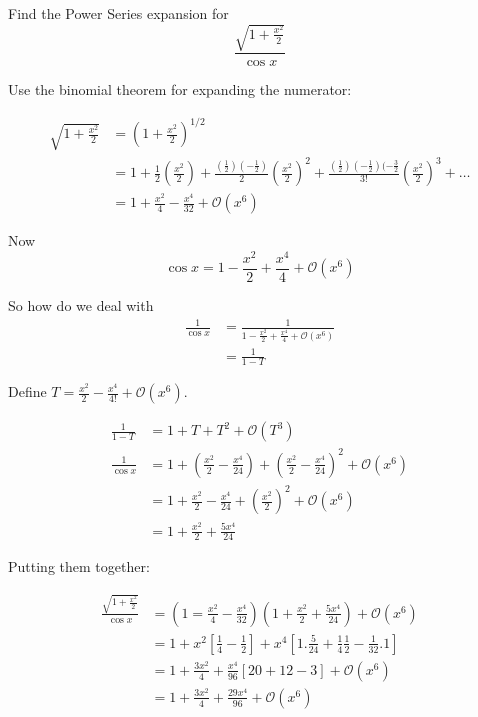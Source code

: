 \documentclass[twoside]{scrartcl}
\begin{document}
\begin{example}
Find the Power Series expansion for
\[\frac{\sqrt{1 + \frac{x^2}{2}}}{\cos x}\]	

Use the binomial theorem for expanding the numerator: 

\[
\begin{aligned}
  \sqrt{1 + \frac{x^2}{2}} &= \left(1 + \frac{x^2}{2}\right)^{1/2}\\
  &= 1 + \frac{1}{2}\left(\frac{x^2}{2}\right) + \frac{(\frac{1}{2})(-\frac{1}{2})}{2} \left(\frac{x^2}{2}\right)^2 +\frac{(\frac{1}{2})(-\frac{1}{2})(-\frac{3}{2}}{3!} \left(\frac{x^2}{2}\right)^3 + \dots \\
  &= 1 + \frac{x^2}{4} -\frac{x^4}{32} + \mathcal{O}(x^6)
\end{aligned}
\]

Now 
\[\cos x = 1 - \frac{x^2}{2} + \frac{x^4}{4} + \mathcal{O}(x^6)\]

So how do we deal with 
\[\begin{aligned}\frac{1}{\cos x} &= \frac{1}{1 - \frac{x^2}{2} + \frac{x^4}{4} + \mathcal{O}(x^6)}\\
&= \frac{1}{1-T}\end{aligned}\]

Define $T = \frac{x^2}{2} -\frac{x^4}{4!} + \mathcal{O}(x^6)$. 

\[
\begin{aligned}
  \frac{1}{1-T} &= 1 + T + T^2 + \mathcal{O}(T^3)\\
  \frac{1}{\cos x} &= 1 + \left(\frac{x^2}{2} - \frac{x^4}{24}\right) + \left(\frac{x^2}{2} - \frac{x^4}{24}\right)^2 + \mathcal{O}(x^6)\\
  &= 1 + \frac{x^2}{2} - \frac{x^4}{24} + \left(\frac{x^2}{2}\right)^2 + \mathcal{O}(x^6)\\
  &= 1 + \frac{x^2}{2} + \frac{5x^4}{24}
\end{aligned}
\]

Putting them together: 

\[
\begin{aligned}
  \frac{\sqrt{1 + \frac{x^2}{2}}}{\cos x} &= \left(1 = \frac{x^2}{4} - \frac{x^4}{32}\right)\left(1 + \frac{x^2}{2} + \frac{5x^4}{24}\right) + \mathcal{O}(x^6)\\
  &= 1 + x^2\left[ \frac{1}{4} - \frac{1}{2}\right] + x^4\left[1.\frac{5}{24} + \frac{1}{4}\frac{1}{2} - \frac{1}{32}.1\right]\\
  &= 1 + \frac{3x^2}{4} + \frac{x^4}{96}[ 20 + 12 - 3] + \mathcal{O}(x^6)\\
  &= 1 + \frac{3x^2}{4} + \frac{29x^4}{96} + \mathcal{O}(x^6)
\end{aligned}
\]
\end{example}\vspace*{5pt}
\end{document}
